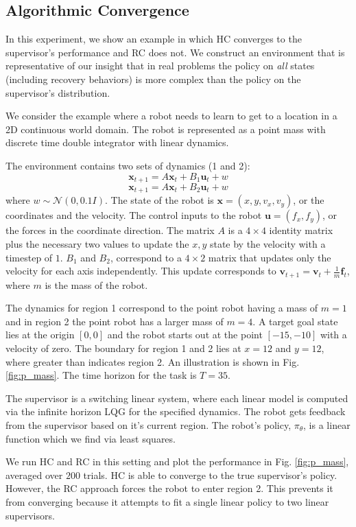 \documentclass[10pt, conference]{ieeeconf}      %
\newcommand{\bu}{\mathbf{u}}
\newcommand{\bx}{\mathbf{x}}
\begin{document}
\subsection{Algorithmic Convergence}
In this experiment, we show an example in which HC converges to the supervisor's performance and RC does not. We construct an environment that is representative of our insight that in real problems the policy on \emph{all} states (including recovery behaviors) is more complex than the policy on the supervisor's distribution.

We consider the example where a robot needs to learn to get to a location in a 2D continuous world domain. The robot is represented as a point mass with discrete time double integrator with linear dynamics. 

The environment contains two sets of dynamics (1 and 2): 
$$\bx_{t+1} = A\bx_{t}+B_1\bu_t+w$$
$$\bx_{t+1} = A\bx_{t}+B_2\bu_t + w$$
where $w\sim \mathcal{N}(0,0.1 I)$. The state of the robot is $\bx = (x,y,v_x,v_y)$, or the coordinates and the velocity. The control inputs to the robot $\bu = (f_x,f_y)$, or the forces in the coordinate direction. The matrix $A$ is a $4\times4$ identity matrix plus the necessary two values to update the $x,y$ state by the velocity with a timestep of $1$. $B_1$ and $B_2$, correspond to a $4\times 2$ matrix that updates only the velocity for each axis independently. This update corresponds to $\mathbf{v}_{t+1} = \mathbf{v}_t+\frac{1}{m} \mathbf{f}_t$, where $m$ is the mass of the robot.


The dynamics for region 1 correspond to the point robot having a mass of $m=1$ and in region 2 the point robot has a larger mass of $m=4$. A target goal state lies at the origin $[0,0]$ and the robot starts out at the point $[-15,-10]$ with a velocity of zero. The boundary for region 1 and 2 lies at $x=12$ and $y=12$, where greater than indicates region 2. An illustration is shown in Fig. \ref{fig:p_mass}. The time horizon for the task is $T=35$. 

The supervisor is a switching linear system, where each linear model is computed via the infinite horizon LQG for the specified dynamics. The robot gets feedback from the supervisor based on it's current region. The robot's policy, $\pi_{\theta}$, is a linear function which we find via least squares. 

We run HC and RC in this setting and plot the performance in Fig. \ref{fig:p_mass}, averaged over $200$ trials.  HC is able to converge to the true supervisor's policy.
However, the RC approach forces the robot to enter region 2.
This prevents it from converging because it attempts to fit a single linear policy to two linear supervisors.
\end{document}
